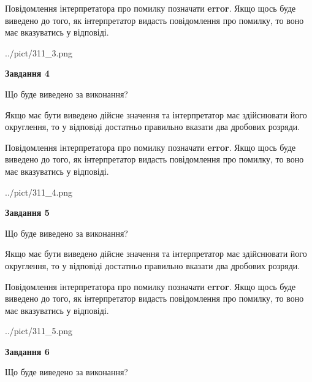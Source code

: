 \documentclass[12pt, ukrainian]{article}
\begin{document}
{\begin {Large}
Повідомлення інтерпретатора про помилку позначати \textbf{error}.
Якщо щось буде виведено до того, як інтерпретатор видасть повідомлення про помилку, 
то воно має вказуватись у відповіді. \par

\begin{center}
	{../pict/311_3.png}
\end{center}
\newpage

{\begin {center}\textbf{Завдання 4}\end {center}}\par
Що буде виведено за виконання? \par

Якщо має бути виведено дійсне значення та інтерпретатор має здійснювати його округлення, 
то у відповіді достатньо правильно вказати два дробових розряди.

Повідомлення інтерпретатора про помилку позначати \textbf{error}.
Якщо щось буде виведено до того, як інтерпретатор видасть повідомлення про помилку, 
то воно має вказуватись у відповіді. \par

\begin{center}
	{../pict/311_4.png}
\end{center}
\newpage

{\begin {center}\textbf{Завдання 5}\end {center}}\par
Що буде виведено за виконання? \par

Якщо має бути виведено дійсне значення та інтерпретатор має здійснювати його округлення, 
то у відповіді достатньо правильно вказати два дробових розряди.

Повідомлення інтерпретатора про помилку позначати \textbf{error}.
Якщо щось буде виведено до того, як інтерпретатор видасть повідомлення про помилку, 
то воно має вказуватись у відповіді. \par

\begin{center}
	{../pict/311_5.png}
\end{center}
\newpage

{\begin {center}\textbf{Завдання 6}\end {center}}\par
Що буде виведено за виконання? \par


\end{Large}}
\end{document}
